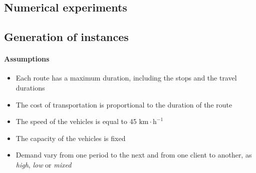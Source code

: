 \documentclass[a4paper,10pt]{article}
\begin{document}
\begin{linenumbers}


\section{Numerical experiments}
\label{sec:expe}
\subsection{Generation of instances}
\paragraph{Assumptions}
\begin{itemize}
    \item Each route has a maximum duration, including the stops and the travel durations
    \item The cost of transportation is proportional to the duration of the route
    \item The speed of the vehicles is equal to 45 $\text{km}\cdot\text{h}^{-1}$
    \item The capacity of the vehicles is fixed
    \item Demand vary from one period to the next and from one client to another, as {\em high}, {\em low} or {\em mixed}
    \end{itemize}

\end{linenumbers}
\end{document}
